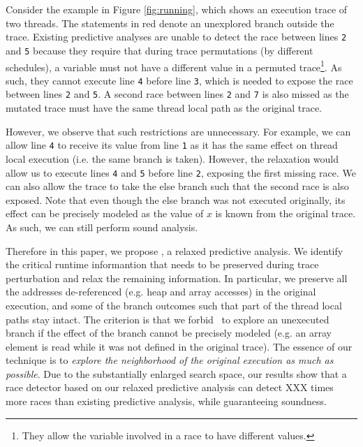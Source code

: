 Consider the example in Figure \ref{fig:running}, which shows an execution trace of two threads. The statements in red 
denote an unexplored branch outside the trace. Existing predictive analyses are unable to detect the race between 
lines {\tt 2} and {\tt 5} because they require that during trace permutations (by different schedules), a variable must not have
a different value in a permuted trace\footnote{They allow the variable involved in a race to have different values.}.
As such, they cannot execute line {\tt 4} before line {\tt 3}, which is needed to expose the race between lines {\tt 2}
and {\tt 5}. 
A second race between lines {\tt 2} and {\tt 7} is also missed as the mutated trace must have the same thread local
path as the original trace. 

However, we observe that such restrictions are unnecessary. For example, we can allow line {\tt 4} to receive its
value from line {\tt 1} as it has the same effect on thread local execution (i.e. the same branch is taken). 
However, the relaxation would allow us to execute lines {\tt 4} and {\tt 5} before line {\tt 2}, exposing 
the first missing race. We can also allow the trace to take the else branch such that the second race is also exposed. 
Note that even though the else branch was not executed originally, its effect can be precisely modeled as the value 
of $x$ is known from the original trace. As such, we can still perform sound analysis.

Therefore in this paper, we propose \sysname, a relaxed predictive analysis. We identify the critical runtime
informantion that needs to be preserved during trace perturbation and relax the remaining information. 
In particular, we preserve all the addresses de-referenced (e.g. heap and array accesses) in the original execution,
and some of the branch outcomes such that part of the thread local paths stay intact. The criterion is that
we forbid \sysname\ to explore an unexecuted branch if the effect of the branch cannot be precisely modeled
(e.g. an array element is read while it was not defined in the original trace). The essence of our technique 
is to {\em explore the neighborhood of the original execution as much as possible}. Due to the substantially
enlarged search space, our results show that a race detector based on our relaxed predictive analysis 
can detect XXX times more races than existing predictive analysis, while guaranteeing soundness. 

